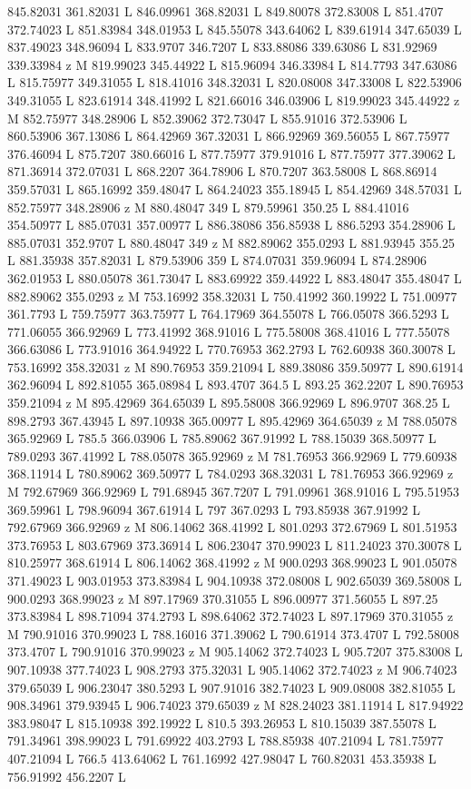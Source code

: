 {\begin{scope}[local bounding box=bb]
{845.82031 361.82031 L 846.09961 368.82031 L 849.80078 372.83008 L 851.4707 372.74023 L 851.83984 348.01953 L 845.55078 343.64062 L 839.61914 347.65039 L 837.49023 348.96094 L 833.9707 346.7207 L 833.88086 339.63086 L 831.92969 339.33984 z M 819.99023 345.44922 L 815.96094 346.33984 L 814.7793 347.63086 L 815.75977 349.31055 L 818.41016 348.32031 L 820.08008 347.33008 L 822.53906 349.31055 L 823.61914 348.41992 L 821.66016 346.03906 L 819.99023 345.44922 z M 852.75977 348.28906 L 852.39062 372.73047 L 855.91016 372.53906 L 860.53906 367.13086 L 864.42969 367.32031 L 866.92969 369.56055 L 867.75977 376.46094 L 875.7207 380.66016 L 877.75977 379.91016 L 877.75977 377.39062 L 871.36914 372.07031 L 868.2207 364.78906 L 870.7207 363.58008 L 868.86914 359.57031 L 865.16992 359.48047 L 864.24023 355.18945 L 854.42969 348.57031 L 852.75977 348.28906 z M 880.48047 349 L 879.59961 350.25 L 884.41016 354.50977 L 885.07031 357.00977 L 886.38086 356.85938 L 886.5293 354.28906 L 885.07031 352.9707 L 880.48047 349 z M 882.89062 355.0293 L 881.93945 355.25 L 881.35938 357.82031 L 879.53906 359 L 874.07031 359.96094 L 874.28906 362.01953 L 880.05078 361.73047 L 883.69922 359.44922 L 883.48047 355.48047 L 882.89062 355.0293 z M 753.16992 358.32031 L 750.41992 360.19922 L 751.00977 361.7793 L 759.75977 363.75977 L 764.17969 364.55078 L 766.05078 366.5293 L 771.06055 366.92969 L 773.41992 368.91016 L 775.58008 368.41016 L 777.55078 366.63086 L 773.91016 364.94922 L 770.76953 362.2793 L 762.60938 360.30078 L 753.16992 358.32031 z M 890.76953 359.21094 L 889.38086 359.50977 L 890.61914 362.96094 L 892.81055 365.08984 L 893.4707 364.5 L 893.25 362.2207 L 890.76953 359.21094 z M 895.42969 364.65039 L 895.58008 366.92969 L 896.9707 368.25 L 898.2793 367.43945 L 897.10938 365.00977 L 895.42969 364.65039 z M 788.05078 365.92969 L 785.5 366.03906 L 785.89062 367.91992 L 788.15039 368.50977 L 789.0293 367.41992 L 788.05078 365.92969 z M 781.76953 366.92969 L 779.60938 368.11914 L 780.89062 369.50977 L 784.0293 368.32031 L 781.76953 366.92969 z M 792.67969 366.92969 L 791.68945 367.7207 L 791.09961 368.91016 L 795.51953 369.59961 L 798.96094 367.61914 L 797 367.0293 L 793.85938 367.91992 L 792.67969 366.92969 z M 806.14062 368.41992 L 801.0293 372.67969 L 801.51953 373.76953 L 803.67969 373.36914 L 806.23047 370.99023 L 811.24023 370.30078 L 810.25977 368.61914 L 806.14062 368.41992 z M 900.0293 368.99023 L 901.05078 371.49023 L 903.01953 373.83984 L 904.10938 372.08008 L 902.65039 369.58008 L 900.0293 368.99023 z M 897.17969 370.31055 L 896.00977 371.56055 L 897.25 373.83984 L 898.71094 374.2793 L 898.64062 372.74023 L 897.17969 370.31055 z M 790.91016 370.99023 L 788.16016 371.39062 L 790.61914 373.4707 L 792.58008 373.4707 L 790.91016 370.99023 z M 905.14062 372.74023 L 905.7207 375.83008 L 907.10938 377.74023 L 908.2793 375.32031 L 905.14062 372.74023 z M 906.74023 379.65039 L 906.23047 380.5293 L 907.91016 382.74023 L 909.08008 382.81055 L 908.34961 379.93945 L 906.74023 379.65039 z M 828.24023 381.11914 L 817.94922 383.98047 L 815.10938 392.19922 L 810.5 393.26953 L 810.15039 387.55078 L 791.34961 398.99023 L 791.69922 403.2793 L 788.85938 407.21094 L 781.75977 407.21094 L 766.5 413.64062 L 761.16992 427.98047 L 760.82031 453.35938 L 756.91992 456.2207 L }
\end{scope}}
